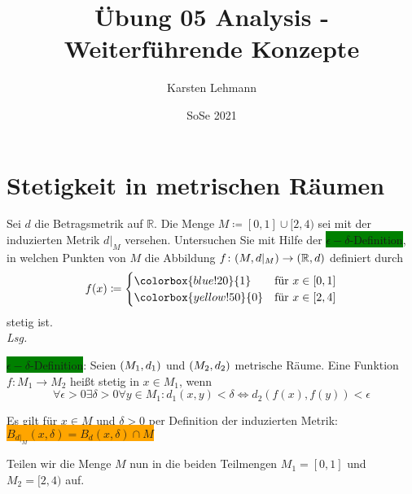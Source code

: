 \documentclass{scrreprt}
\author{Karsten Lehmann}
\date{SoSe 2021}
\title{Übung 05 Analysis - Weiterführende Konzepte}
\begin{document}
\section*{Stetigkeit in metrischen Räumen}

Sei $d$ die Betragsmetrik auf $\mathbb{R}$.
Die Menge $M \coloneqq [0, 1] \cup [2, 4)$ sei mit der induzierten Metrik
$d|_M$ versehen.
Untersuchen Sie mit Hilfe der \colorbox{green}{$\epsilon-\delta$-Definition}, in welchen Punkten
von $M$ die Abbildung $f \colon \qty(M, d|_M) \to \qty(\mathbb{R}, d)$
definiert durch
\[
  f(x) \coloneqq \begin{cases}
    \colorbox{blue!20}{1} & \text{für } x \in [0, 1] \\
    \colorbox{yellow!50}{0} & \text{für } x \in [2, 4] \\
  \end{cases}
\]
stetig ist. \\

\textit{Lsg.}

\colorbox{green}{$\epsilon-\delta$-Definition}: Seien $\qty(M_1, d_1)$
und $\qty(M_2, d_2)$ metrische Räume.
Eine Funktion $f \colon M_1 \to M_2$ heißt stetig in $x \in M_1$, wenn
\[
  \forall \epsilon > 0 \exists \delta > 0 \forall y \in M_1 \colon d_1(x, y) < \delta
  \iff d_2(f(x), f(y)) < \epsilon
\]

Es gilt für $x \in M$ und $\delta > 0$ per Definition der induzierten Metrik:
\colorbox{orange}{$B_{d|_M} (x, \delta) = B_d(x, \delta) \cap M$}

Teilen wir die Menge $M$ nun in die beiden Teilmengen
$M_1 = [0, 1]$ und $M_2 = [2, 4)$ auf.
\end{document}
